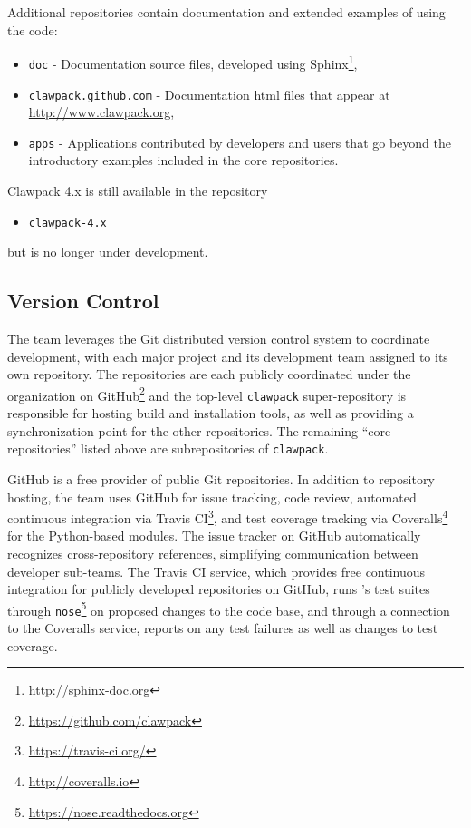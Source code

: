 Additional repositories contain documentation and extended examples of
using the code:
\begin{itemize}
    \item \texttt{doc} - Documentation source files, developed using
Sphinx\footnote{\url{http://sphinx-doc.org}},
    \item \texttt{clawpack.github.com} - Documentation html files that appear
at \url{http://www.clawpack.org},
    \item \texttt{apps} - Applications contributed by developers and users
that go beyond the introductory examples included in the core repositories.
\end{itemize}
Clawpack 4.x is still available in the repository
\begin{itemize}
    \item \texttt{clawpack-4.x}
\end{itemize}
but is no longer under development.


\subsection{Version Control}

The \clawpack team leverages the Git distributed version control system
to coordinate development, with each major project and its development
team assigned to its own repository.  The repositories are each
publicly coordinated under the \clawpack organization on
GitHub\footnote{\url{https://github.com/clawpack}} and the
top-level \texttt{clawpack} super-repository is responsible for hosting
build and installation tools, as well as providing a synchronization
point for the other repositories.  The remaining ``core \clawpack repositories''
listed above are subrepositories of \texttt{clawpack}.

GitHub is a free provider of public Git repositories.  In addition to
repository hosting, the \clawpack team uses GitHub for issue tracking,
code review, automated continuous integration via Travis CI\footnote{\url{https://travis-ci.org/}},
and test coverage tracking via Coveralls\footnote{\url{http://coveralls.io}}
for the Python-based modules.  The issue tracker on
GitHub automatically recognizes cross-repository references,
simplifying communication between \clawpack developer sub-teams.  The
Travis CI service, which provides free continuous integration for
publicly developed repositories on GitHub, runs \clawpack's test
suites through \texttt{nose}\footnote{\url{https://nose.readthedocs.org}}
on proposed changes
to the code base, and through a connection to the Coveralls service,
reports on any test failures as well as changes to test coverage.

